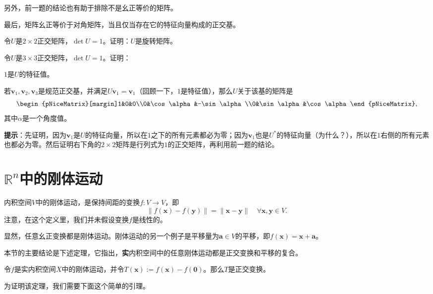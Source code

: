 \begin{problemset}
    另外，前一题的结论也有助于排除不是幺正等价的矩阵。

    最后，矩阵幺正等价于对角矩阵，当且仅当存在它的特征向量构成的正交基。
    \item 令$U$是$2\times 2$正交矩阵，$\det U=1$。证明：$U$是旋转矩阵。
    \item 令$U$是$3\times 3$正交矩阵，$\det U=1$。证明：
    \begin{probenumerate}
        \item $1$是$U$的特征值。
        \item 若$\mathbf{v}_{1},\mathbf{v}_{2},\mathbf{v}_{3}$是规范正交基，并满足$U\mathbf{v}_{1}=\mathbf{v}_{1}$（回顾一下，$1$是特征值），那么$U$关于该基的矩阵是\[\begin{pNiceMatrix}[margin]1&0&0\\0&\cos\alpha&-\sin\alpha\\0&\sin\alpha&\cos\alpha\end{pNiceMatrix},\]
        其中$\alpha$是一个角度值。

        {\bf 提示}：先证明，因为$\mathbf{v}_1$是$U$的特征向量，所以在$1$之下的所有元素都必为零；因为$\mathbf{v}_1$也是$U^*$的特征向量（为什么？），所以在$1$右侧的所有元素也都必为零。然后证明右下角的$2\times 2$矩阵是行列式为$1$的正交矩阵，再利用前一题的结论。
    \end{probenumerate}
\end{problemset}

\section{\texorpdfstring{$\mathbb{R}^n$}{R\^{}n}中的刚体运动}

内积空间$V$中的刚体运动，是保持间距的变换$f:V\to V$，即
\[\|f(\mathbf{x})-f(\mathbf{y})\|=\|\mathbf{x}-\mathbf{y}\|\quad\forall\mathbf{x},\mathbf{y}\in V.\]
注意，在这个定义里，我们并未假设变换$f$是线性的。

显然，任意幺正变换都是刚体运动。刚体运动的另一个例子是平移量为$\mathbf{a}\in V$的平移，即$f(\mathbf{x})=\mathbf{x}+\mathbf{a}$。

本节的主要结论是下述定理，它指出，{\bf 实}内积空间中的任意刚体运动都是正交变换和平移的复合。

\begin{theorem}\label{thm:no_translation_orthogonal}
    令$f$是实内积空间$X$中的刚体运动，并令$T(\mathbf{x}):=f(\mathbf{x})-f(\mathbf{0})$。那么$T$是正交变换。
\end{theorem}

为证明该定理，我们需要下面这个简单的引理。

